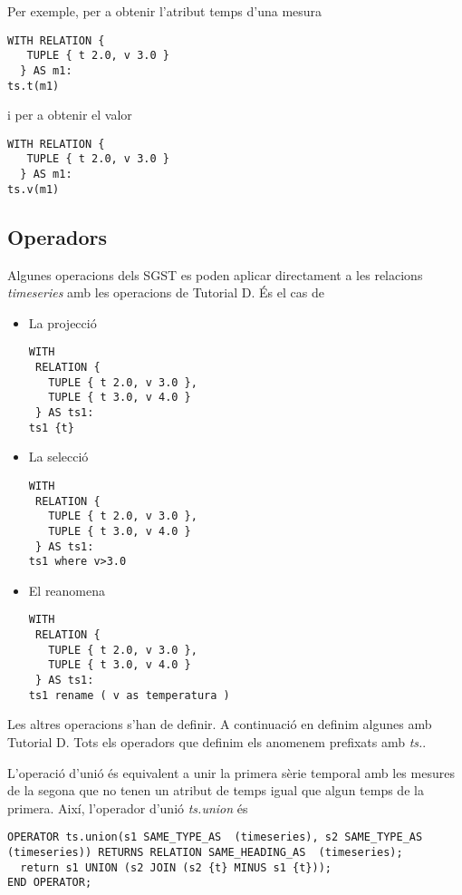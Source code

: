 Per exemple, per a obtenir l'atribut temps d'una mesura
\begin{verbatim}
WITH RELATION {
   TUPLE { t 2.0, v 3.0 }
  } AS m1: 
ts.t(m1)
\end{verbatim}
i per a obtenir el valor
\begin{verbatim}
WITH RELATION {
   TUPLE { t 2.0, v 3.0 }
  } AS m1: 
ts.v(m1)
\end{verbatim}




\subsection{Operadors}


Algunes operacions dels SGST es poden aplicar directament a les
relacions \emph{timeseries} amb les operacions de Tutorial D. 
És el cas de
\begin{itemize}
\item La projecció
\begin{verbatim}
WITH
 RELATION {
   TUPLE { t 2.0, v 3.0 },
   TUPLE { t 3.0, v 4.0 }
 } AS ts1:
ts1 {t}
\end{verbatim}

\item La selecció
\begin{verbatim}
WITH
 RELATION {
   TUPLE { t 2.0, v 3.0 },
   TUPLE { t 3.0, v 4.0 }
 } AS ts1:
ts1 where v>3.0
\end{verbatim}

\item El reanomena
\begin{verbatim}
WITH
 RELATION {
   TUPLE { t 2.0, v 3.0 },
   TUPLE { t 3.0, v 4.0 }
 } AS ts1:
ts1 rename ( v as temperatura )
\end{verbatim}
\end{itemize}





Les altres operacions s'han de definir. A continuació en definim
algunes amb Tutorial D.  Tots els operadors que definim els anomenem
prefixats amb \emph{ts.}.



L'operació d'unió és equivalent a unir la primera sèrie temporal amb
les mesures de la segona que no tenen un atribut de temps igual que
algun temps de la primera. Així, l'operador d'unió \emph{ts.union} és
\begin{verbatim}
OPERATOR ts.union(s1 SAME_TYPE_AS  (timeseries), s2 SAME_TYPE_AS  (timeseries)) RETURNS RELATION SAME_HEADING_AS  (timeseries);
  return s1 UNION (s2 JOIN (s2 {t} MINUS s1 {t}));
END OPERATOR;
\end{verbatim}

